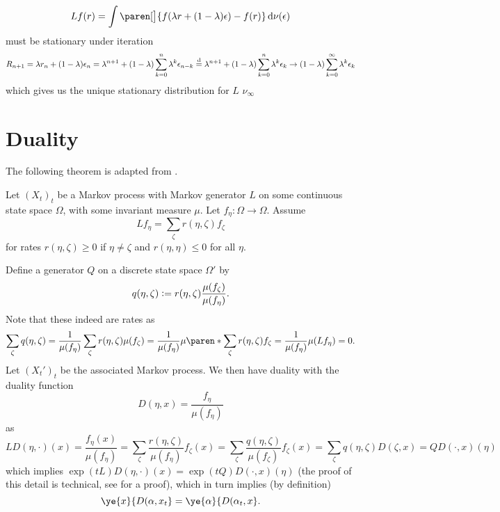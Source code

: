 \documentclass{article}
\begin{document}
\[
Lf(r) = \int \paren[\big]{f(\lambda r + (1 - \lambda)\epsilon) - f(r) } \diff \nu(\epsilon)
\]
must be stationary under iteration
\[
R_{n+1} = \lambda r_n + (1-\lambda)\epsilon_n
\\= \lambda^{n+1} + (1-\lambda)\sum_{k=0}^n \lambda^{k} \epsilon_{n-k}
\\\overset{\mathop{}\!\mathrm{d}}{=} \lambda^{n+1} + (1-\lambda)\sum_{k=0}^n \lambda^{k} \epsilon_{k}
\to 
 (1-\lambda)\sum_{k=0}^{\infty} \lambda^{k} \epsilon_{k}
\]
which gives us the unique stationary distribution for $L$ $\nu_{\infty}$



\section{Duality}
The following theorem is adapted from \cite{barbour2000transition}.

Let $(X_t)_t$ be a Markov process with Markov generator $L$ on some continuous state space $\Omega$, with some invariant measure $\mu$. Let $f_{\eta} \colon \Omega \to \Omega$. Assume
\[
L f_{\eta} = \sum_{\zeta} r(\eta, \zeta) f_{\zeta}
\]
for rates $r(\eta, \zeta) \ge 0$ if $\eta \ne \zeta$ and $r(\eta, \eta) \le 0$ for all $\eta$.

Define a generator $Q$ on a discrete state space $\Omega'$ by
\[
q(\eta, \zeta) \vcentcolon= r(\eta, \zeta)\frac{\mu(f_{\zeta})}{\mu(f_{\eta})}.
\]
Note that these indeed are rates as
\[
\sum_{\zeta} q(\eta, \zeta)
= \frac{1}{\mu(f_{\eta})} \sum_{\zeta} r(\eta, \zeta)\mu(f_{\zeta})
= \frac{1}{\mu(f_{\eta})} \mu\paren*{\sum_{\zeta} r(\eta, \zeta) f_{\zeta}}
= \frac{1}{\mu(f_{\eta})} \mu(L f_{\eta})
= 0.
\]
Let $(X_t')_t$ be the associated Markov process. We then have duality with the duality function
\[
D(\eta, x) = \frac{f_{\eta}}{\mu(f_{\eta})}
\]
as
\[
LD(\eta, \cdot)(x)
= \frac{f_{\eta}(x)}{\mu(f_{\eta})}
= \sum_{\zeta} \frac{r(\eta, \zeta)}{\mu(f_{\eta})} f_{\zeta}(x)
= \sum_{\zeta} \frac{q(\eta, \zeta)}{\mu(f_{\zeta})} f_{\zeta}(x)
= \sum_{\zeta} q(\eta, \zeta) D(\zeta, x)
= Q D(\cdot, x)(\eta)
\]
which implies $\exp(tL) D(\eta, \cdot)(x) = \exp(tQ) D(\cdot, x)(\eta)$ (the proof of this detail is technical, see \cite{voss2011equivalence} for a proof), which in turn implies (by definition) %
\[
\ye{x}{D(\alpha, x_t}
= \ye{\alpha}{D(\alpha_t, x}.
\]
\end{document}

